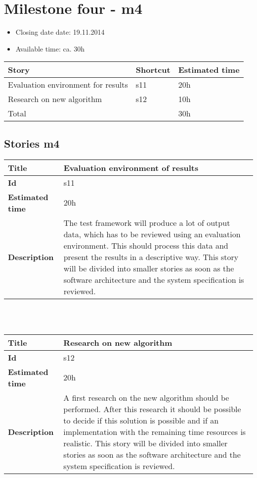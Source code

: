 \section{Milestone four - m4}

\begin{itemize}
\item Closing date date: 19.11.2014
\item Available time: ca. 30h
\end{itemize}

    \begin{tabular}{ | p{10cm} | p{2cm} | p{2cm} |}
    \hline
    \textbf{Story} & \textbf{Shortcut}& \textbf{Estimated time} \\ \hline
    Evaluation environment for results & s11 &20h \\
    Research on new algorithm & s12 &10h \\ \hline
    Total &  & 30h\\

    \hline
    \end{tabular}

\subsection {Stories m4}

    \begin{tabular}{ | p{4cm} | p{10cm} |}
    \hline
    \textbf{Title} & Evaluation environment of results\\ \hline
    \textbf{Id} & s11\\ \hline
    \textbf{Estimated time} & 20h \\ \hline
    \textbf{Description} &  The test framework will produce a lot of output data, which has to be reviewed using an evaluation environment. This should process this data and present the results in a descriptive way.
    This story will be divided into smaller stories as soon as the software architecture and the system specification is reviewed.\\ 
    \hline
    \end{tabular} \\\\

        \begin{tabular}{ | p{4cm} | p{10cm} |}
    \hline
    \textbf{Title} & Research on new algorithm\\ \hline
    \textbf{Id} & s12\\ \hline
    \textbf{Estimated time} & 20h \\ \hline
    \textbf{Description} &  A first research on the new algorithm should be performed. After this research it should be possible to decide if this solution is possible and if an implementation with the remaining time resources is realistic.
    This story will be divided into smaller stories as soon as the software architecture and the system specification is reviewed.\\ 
    \hline
    \end{tabular} \\\\



